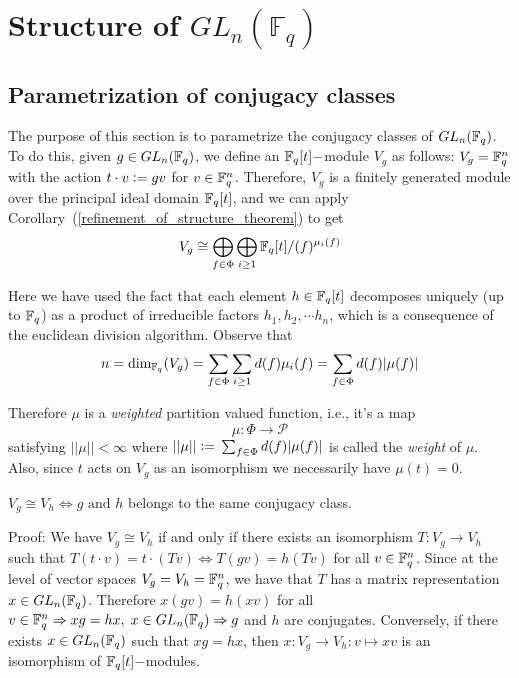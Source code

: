 \section{\texorpdfstring{Structure of $GL_n(\mathbb{F}_q)$}{Structure of GLn(Fq)}}
\subsection{Parametrization of conjugacy classes}
The purpose of this section is to parametrize the conjugacy classes of $GL_n(\mathbb{F}_q)$. To do this, given $g\in GL_n(\mathbb{F}_q)$, we define an $\mathbb{F}_q[t]-$module $V_g$ as follows: $V_g=\mathbb{F}_q^n$ with the action $t\cdot v\bydef gv$ for $v\in\mathbb{F}_q^n$. Therefore, $V_g$ is a finitely generated module over the principal ideal domain $\mathbb{F}_q[t]$, and we can apply Corollary~(\ref{refinement_of_structure_theorem}) to get
\begin{equation}\label{decomposition_of_V_g}
    V_g \cong \bigoplus_{f\in\Phi}\bigoplus_{i\geq1}\mathbb{F}_q[t]/(f)^{\mu_i(f)}
\end{equation}\par
Here we have used the fact that each element $h\in\mathbb{F}_q[t]$ decomposes uniquely (up to $\mathbb{F}_q$) as a product of irreducible factors $h_1,h_2,\cdots h_n$, which is a consequence of the euclidean division algorithm. Observe that 
\begin{equation}\label{weighted_partition_function}
    n = \text{dim}_{\mathbb{F}_q}(V_g)=\sum_{f\in\Phi}\sum_{i\geq1}d(f)\mu_i(f)=\sum_{f\in\Phi}d(f)|\mu(f)|
\end{equation}\par
Therefore $\mu$ is a \textit{weighted} partition valued function, i.e., it's a map
\begin{equation}
    \mu:\Phi\rightarrow\mathcal{P}
\end{equation}
satisfying $||\mu||<\infty$ where $||\mu||\bydef \sum_{f\in\Phi}d(f)|\mu(f)|$ is called the \textit{weight} of $\mu$. Also, since $t$ acts on $V_g$ as an isomorphism we necessarily have $\mu(t)=0$.
\begin{dang}
    \begin{theorem}\label{Vg is isomorphiv to Vh iff g and h are in the same conjugacy class}
        $V_g\cong V_h\iff g\text{ and }h$ belongs to the same conjugacy class.
    \end{theorem}
\end{dang}
Proof: We have $V_g\cong V_h$ if and only if there exists an isomorphism $T:V_g\rightarrow V_h$ such that $T(t\cdot v)=t\cdot (Tv) \iff T(gv)=h(Tv)$ for all $v\in\mathbb{F}_q^n$. Since at the level of vector spaces $V_g=V_h=\mathbb{F}_q^n$, we have that $T$ has a matrix representation $x\in GL_n(\mathbb{F}_q)$. Therefore $x(gv)=h(xv)$ for all $v\in \mathbb{F}_q^n\Rightarrow xg=hx,\;x\in GL_n(\mathbb{F}_q)\Rightarrow g$ and $h$ are conjugates. Conversely, if there exists $x\in GL_n(\mathbb{F}_q)$ such that $xg=hx$, then $x: V_g\rightarrow V_h: v\mapsto xv$ is an isomorphism of $\mathbb{F}_q[t]-$modules. 
